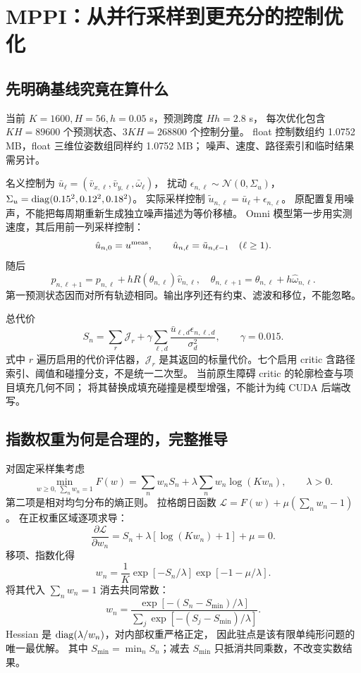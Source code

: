 \section{MPPI：从并行采样到更充分的控制优化}
\subsection{先明确基线究竟在算什么}
当前 $K=1600,H=56,h=0.05$ s，预测跨度 $Hh=2.8$ s，
每次优化包含 $KH=89600$ 个预测状态、$3KH=268800$ 个控制分量。
float 控制数组约 1.0752 MB，float 三维位姿数组同样约 1.0752 MB；
噪声、速度、路径索引和临时结果需另计。

名义控制为 $\bar u_\ell=(\bar v_{x,\ell},\bar v_{y,\ell},\bar\omega_\ell)$，
扰动 $\epsilon_{n,\ell}\sim\mathcal N(0,\Sigma_u)$，
$\Sigma_u=\operatorname{diag}(0.15^2,0.12^2,0.18^2)$。
实际采样控制 $\tilde u_{n,\ell}=\bar u_\ell+\epsilon_{n,\ell}$。
原配置复用噪声，不能把每周期重新生成独立噪声描述为等价移植。
Omni 模型第一步用实测速度，其后用前一列采样控制：
\begin{equation}
\hat u_{n,0}=u^{\rm meas},\qquad
\hat u_{n,\ell}=\tilde u_{n,\ell-1}\quad(\ell\ge1).
\end{equation}
随后
\[
p_{n,\ell+1}=p_{n,\ell}+hR(\theta_{n,\ell})\hat v_{n,\ell},\quad
\theta_{n,\ell+1}=\theta_{n,\ell}+h\hat\omega_{n,\ell}.
\]
第一预测状态因而对所有轨迹相同。输出序列还有约束、滤波和移位，不能忽略。

总代价
\begin{equation}
S_n=\sum_r\mathcal J_r+
\gamma\sum_{\ell,d}\frac{\bar u_{\ell,d}\epsilon_{n,\ell,d}}{\sigma_d^2},
\qquad \gamma=0.015.
\label{eq:mppicost}
\end{equation}
式中 $r$ 遍历启用的代价评估器，$\mathcal J_r$ 是其返回的标量代价。七个启用 critic 含路径索引、阈值和碰撞分支，不是统一二次型。
当前原生障碍 critic 的轮廓检查与项目填充几何不同；
将其替换成填充碰撞是模型增强，不能计为纯 CUDA 后端改写\cite{mppisrc}。

\subsection{指数权重为何是合理的，完整推导}
对固定采样集考虑
\[
\min_{w\ge0,\ \sum_nw_n=1}
F(w)=\sum_nw_nS_n+\lambda\sum_nw_n\log(Kw_n),\qquad\lambda>0.
\]
第二项是相对均匀分布的熵正则。
拉格朗日函数
$\mathcal L=F(w)+\mu(\sum_nw_n-1)$。
在正权重区域逐项求导：
\[
\frac{\partial\mathcal L}{\partial w_n}
=S_n+\lambda[\log(Kw_n)+1]+\mu=0.
\]
移项、指数化得
\[
w_n=\frac1K\exp[-S_n/\lambda]\exp[-1-\mu/\lambda].
\]
将其代入 $\sum_nw_n=1$ 消去共同常数：
\begin{equation}
w_n=\frac{\exp[-(S_n-S_{\min})/\lambda]}
{\sum_j\exp[-(S_j-S_{\min})/\lambda]}.
\label{eq:softmax}
\end{equation}
Hessian 是 $\operatorname{diag}(\lambda/w_n)$，对内部权重严格正定，
因此驻点是该有限单纯形问题的唯一最优解。
其中 $S_{\min}=\min_n S_n$；减去 $S_{\min}$ 只抵消共同乘数，不改变实数结果。

